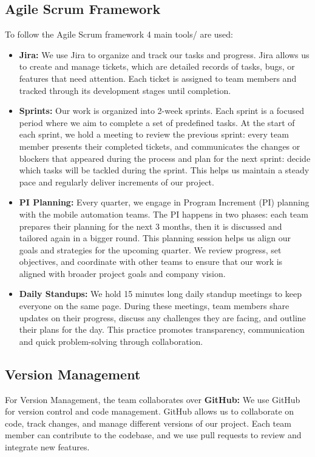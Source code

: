\subsection{Agile Scrum Framework} 
To follow the Agile Scrum framework 4 main tools/ are used:
\begin{itemize}
    \item \textbf{Jira: } We use Jira to organize and track our tasks and progress. Jira allows us to create 
    and manage tickets, which are detailed records of tasks, bugs, or features that need attention. 
    Each ticket is assigned to team members and tracked through its development stages until completion.

    \item \textbf{Sprints: } Our work is organized into 2-week sprints. Each sprint is a focused period 
    where we aim to complete a set of predefined tasks. At the start of each sprint, we hold a meeting to 
    review the previous sprint: every team member presents their completed tickets, and communicates the 
    changes or blockers that appeared during the process and plan for the next sprint: decide which tasks 
    will be tackled during the sprint. 
    This helps us maintain a steady pace and regularly deliver increments of our project.

    \item  \textbf{PI Planning: } Every quarter, we engage in Program Increment (PI) planning with the 
    mobile automation teams. The PI happens in two phases: each team prepares their planning for the next 3
    months, then it is discussed and tailored again in a bigger round. This planning session helps us align 
    our goals and strategies for the upcoming quarter. We review progress, set objectives, and coordinate 
    with other teams to ensure that our work is aligned with broader project goals and company vision.

    \item \textbf{Daily Standups: } We hold 15 minutes long daily standup meetings to keep everyone on the 
    same page. During these meetings, team members share updates on their progress, discuss any challenges 
    they are facing, and outline their plans for the day. This practice promotes transparency, communication and quick 
    problem-solving through collaboration.

\end{itemize}

\subsection{Version Management}
For Version Management, the team collaborates over \textbf{GitHub: }We use GitHub for version control and 
code management. GitHub allows us to 
    collaborate on code, track changes, and manage different versions of our project. Each team member 
    can contribute to the codebase, and we use pull requests to review and integrate new features.


